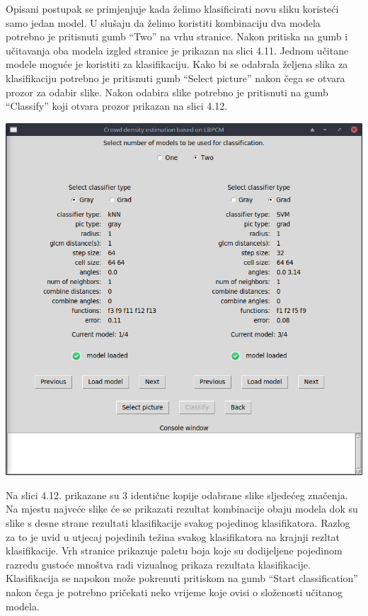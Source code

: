 \documentclass[times, utf8, zavrsni]{fer}
\begin{document}
\bigbreak

Opisani postupak se primjenjuje kada želimo klasificirati novu sliku
koristeći samo jedan model. U slušaju da želimo koristiti kombinaciju
dva modela potrebno je pritisnuti gumb \enquote{Two} na vrhu stranice.
Nakon pritiska na gumb i učitavanja oba modela izgled stranice je prikazan
na slici 4.11. Jednom učitane modele moguće je koristiti za klasifikaciju. Kako
bi se odabrala željena slika za klasifikaciju potrebno je pritisnuti 
gumb \enquote{Select picture} nakon čega se otvara prozor za odabir slike.
Nakon odabira slike potrebno je pritisnuti na gumb \enquote{Classify} koji 
otvara prozor prikazan na slici 4.12.

\bigbreak 

\begin{minipage}{\linewidth}
\centering
\includegraphics[scale=0.4]{img/cl2.png}
\end{minipage}

\bigbreak

Na slici 4.12. prikazane su 3 identične kopije odabrane slike sljedećeg 
značenja. Na mjestu najveće slike će se prikazati rezultat kombinacije 
obaju modela dok su slike s desne strane rezultati klasifikacije svakog 
pojedinog klasifikatora. 
Razlog za to je uvid u utjecaj pojedinih težina svakog klasifikatora na 
krajnji rezltat klasifikacije. Vrh stranice prikazuje paletu boja koje
su dodijeljene pojedinom razredu gustoće mnoštva radi vizualnog
prikaza rezultata klasifikacije. Klasifikacija se napokon može pokrenuti
pritiskom na gumb \enquote{Start classification} nakon čega je potrebno
pričekati neko vrijeme koje ovisi o složenosti učitanog modela. 
\end{document}
